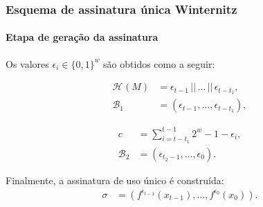 \documentclass[12pt]{beamer}
\newcommand{\hash}[2][]{\mathcal{H}^{#1} (#2)}
\newcommand{\concat}{\, \vert{} \vert{} \,}
\newcommand{\binwds}[1]{\{0, 1\}^{#1}}
\begin{document}
\begin{frame}
  \frametitle{Esquema de assinatura única Winternitz}
  \framesubtitle{Etapa de geração da assinatura}
  Os valores $\epsilon_i \in \binwds{w}$ são obtidos como a seguir:

  \begin{minipage}{.45\linewidth}
    \begin{align*}
      \hash{M} &= \epsilon_{t - 1} \concat \dots \concat \epsilon_{t - t_1}, \\
      \mathcal{B}_1 &= (\epsilon_{t - 1}, \dots, \epsilon_{t - t_1}),
    \end{align*}
  \end{minipage}
  \begin{minipage}{.45\linewidth}
    \begin{align*}
      c &= \textstyle\sum_{i = t - t_1}^{t - 1} 2^w - 1 - \epsilon_i, \\
      \mathcal{B}_2 &= (\epsilon_{t_2 - 1}, \dots, \epsilon_{0}).
    \end{align*}
  \end{minipage}
  \vspace{4mm}

  Finalmente, a assinatura de uso único é construída:
  \begin{align*}
    \sigma &= (f^{\epsilon_{t - 1}}(x_{t - 1}), \dots, f^{\epsilon_0}(x_0)).
  \end{align*}
\end{frame}
\end{document}
